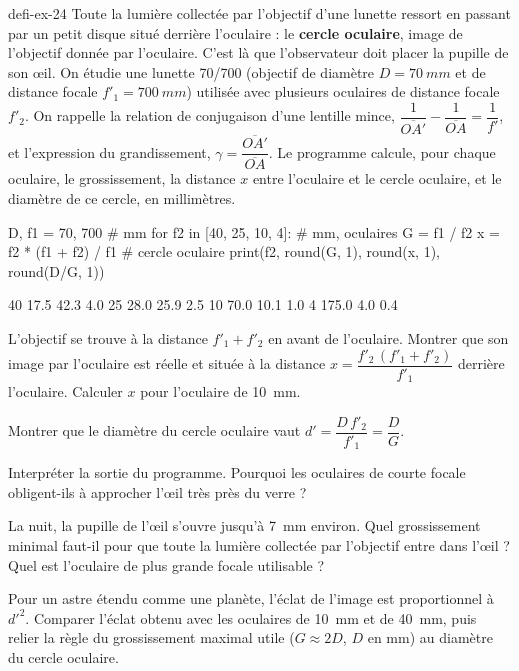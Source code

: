 \begin{blocEdition}{defi-ex-24}
Toute la lumière collectée par l'objectif d'une lunette ressort en passant par un petit disque situé derrière
l'oculaire : le \textbf{cercle oculaire}, image de l'objectif donnée par l'oculaire. C'est là que l'observateur doit placer
la pupille de son œil. On étudie une lunette 70/700 (objectif de diamètre $D=\qty{70}{mm}$ et de distance focale
$f'_1=\qty{700}{mm}$) utilisée avec plusieurs oculaires de distance focale $f'_2$. On rappelle la relation de conjugaison d'une
lentille mince, $\dfrac{1}{\overline{OA'}}-\dfrac{1}{\overline{OA}}=\dfrac{1}{f'}$, et l'expression du grandissement, $\gamma=\dfrac{\overline{OA'}}{\overline{OA}}$. Le
programme calcule, pour chaque oculaire, le grossissement, la distance $x$ entre l'oculaire et le cercle oculaire, et le
diamètre de ce cercle, en millimètres.
\begin{codecote}[0.7]
\begin{pythoncol}
D, f1 = 70, 700                  # mm
for f2 in [40, 25, 10, 4]:       # mm, oculaires
    G = f1 / f2
    x = f2 * (f1 + f2) / f1      # cercle oculaire
    print(f2, round(G, 1), round(x, 1), round(D/G, 1))
\end{pythoncol}
\cote
\begin{consolecol}
40 17.5 42.3 4.0
25 28.0 25.9 2.5
10 70.0 10.1 1.0
4 175.0 4.0 0.4
\end{consolecol}
\end{codecote}
\par\smallskip
\begin{questions}
\item L'objectif se trouve à la distance $f'_1+f'_2$ en avant de l'oculaire. Montrer que son image par l'oculaire est réelle
et située à la distance $x=\dfrac{f'_2\,(f'_1+f'_2)}{f'_1}$ derrière l'oculaire. Calculer $x$ pour l'oculaire de \qty{10}{mm}.
\item Montrer que le diamètre du cercle oculaire vaut $d'=\dfrac{D\,f'_2}{f'_1}=\dfrac{D}{G}$.
\item Interpréter la sortie du programme. Pourquoi les oculaires de courte focale obligent-ils à approcher l'œil très
près du verre ?
\item La nuit, la pupille de l'œil s'ouvre jusqu'à \qty{7}{mm} environ. Quel grossissement minimal faut-il pour que toute la
lumière collectée par l'objectif entre dans l'œil ? Quel est l'oculaire de plus grande focale utilisable ?
\item Pour un astre étendu comme une planète, l'éclat de l'image est proportionnel à $d'^2$. Comparer l'éclat obtenu avec
les oculaires de \qty{10}{mm} et de \qty{40}{mm}, puis relier la règle du grossissement maximal utile ($G\approx2D$, $D$ en mm) au
diamètre du cercle oculaire.
\end{questions}
\end{blocEdition}

